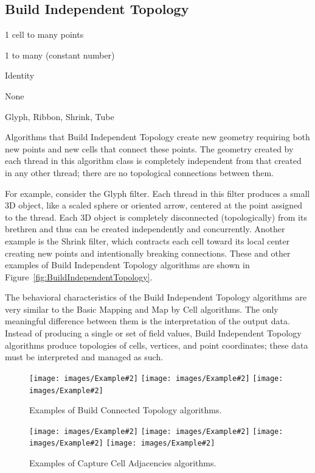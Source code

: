 \documentclass{sig-alternate}
\newcommand{\algclass}[1]{\textsf{#1}}
\newcommand{\alg}[1]{#1}
\newcommand{\algorithmclasssection}[1]{\subsection*{#1}}
\newcommand{\algorithmclass}[6]{
  \algorithmclasssection{#1} %
  \begin{description}[leftmargin=9em,style=nextline,noitemsep]
    \raggedright
  \item[Point Mapping] #2
  \item[Cell Mapping] #3
  \item[Field Mapping] #4
  \item[Collective Work] #5
  \item[Algorithms] #6
  \end{description}
}
\newcommand{\exampleimage}[2][.24]{\texttt{[image: images/Example\#2]}}
\begin{document}
\algorithmclass{Build Independent Topology}
               {1 cell to many points} %
               {1 to many (constant number)} %
               {Identity} %
               {None} %
               {
                 Glyph,
                 Ribbon,
                 Shrink,
                 Tube
               }

\noindent
Algorithms that \algclass{Build Independent Topology} create new geometry
requiring both new points and new cells that connect these points. The
geometry created by each thread in this algorithm class is completely
independent from that created in any other thread; there are no topological
connections between them.

For example, consider the \alg{Glyph} filter. Each thread in this filter
produces a small 3D object, like a scaled sphere or oriented arrow,
centered at the point assigned to the thread. Each 3D object is completely
disconnected (topologically) from its brethren and thus can be created
independently and concurrently. Another example is the \alg{Shrink} filter,
which contracts each cell toward its local center creating new points and
intentionally breaking connections. These and other examples of
\algclass{Build Independent Topology} algorithms are shown in
Figure~\ref{fig:BuildIndependentTopology}.

The behavioral characteristics of the \algclass{Build Independent Topology}
algorithms are very similar to the \algclass{Basic Mapping} and
\algclass{Map by Cell} algorithms. The only meaningful difference between
them is the interpretation of the output data. Instead of producing a
single or set of field values, \algclass{Build Independent Topology}
algorithms produce topologies of cells, vertices, and point coordinates;
these data must be interpreted and managed as such.


\begin{figure}
  \centering
  \exampleimage[.31]{Clip}
  \exampleimage[.31]{Contour}
  \exampleimage[.31]{Slice}
  \caption{Examples of \algclass{Build Connected Topology} algorithms.}
  \label{fig:BuildConnectedTopology}
\end{figure}

\begin{figure}
  \centering
  \exampleimage{ExtractEdges}
  \exampleimage{FeatureEdges}
  \exampleimage{Gradient}
  \exampleimage{Normals}
  \caption{Examples of \algclass{Capture Cell Adjacencies} algorithms.}
  \label{fig:CaptureCellAdjacencies}
\end{figure}
\end{document}
